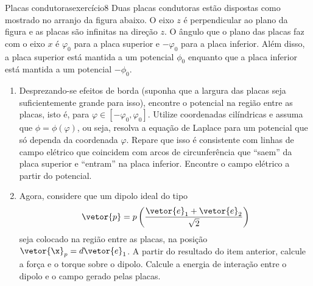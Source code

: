 \begin{exercício}{Placas condutoras}{exercício8}
    Duas placas condutoras estão dispostas como mostrado no arranjo da figura abaixo. O eixo \(z\) é perpendicular ao plano da figura e as placas são infinitas na direção \(z\). O ângulo que o plano das placas faz com o eixo \(x\) é \(\varphi_0\) para a placa superior e \(-\varphi_0\) para a placa inferior. Além disso, a placa superior está mantida a um potencial \(\phi_0\) enquanto que a placa inferior está mantida a um potencial \(-\phi_0\).
    \begin{center}

    \end{center}
    \begin{enumerate}[label=(\alph*)]
        \item Desprezando-se efeitos de borda (suponha que a largura das placas seja suficientemente grande para isso), encontre o potencial na região entre as placas, isto é, para \(\varphi \in [-\varphi_0, \varphi_0]\). Utilize coordenadas cilíndricas e assuma que \(\phi = \phi(\varphi)\), ou seja, resolva a equação de Laplace para um potencial que só dependa da coordenada \(\varphi\). Repare que isso é consistente com linhas de campo elétrico que coincidem com arcos de circunferência que \enquote{saem} da placa superior e \enquote{entram} na placa inferior. Encontre o campo elétrico a partir do potencial.
        \item Agora, considere que um dipolo ideal do tipo
            \begin{equation*}
                \vetor{p} = p\left(\frac{\vetor{e}_1 + \vetor{e}_2}{\sqrt{2}}\right)
            \end{equation*}
            seja colocado na região entre as placas, na posição \(\vetor{\x}_p = d\vetor{e}_1\). A partir do resultado do item anterior, calcule a força e o torque sobre o dipolo. Calcule a energia de interação entre o dipolo e o campo gerado pelas placas.
    \end{enumerate}
\end{exercício}
